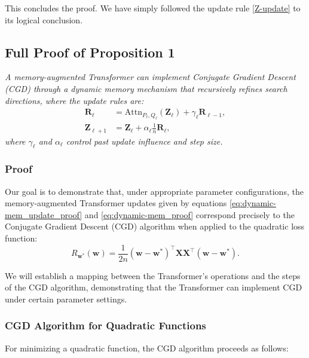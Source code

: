 \documentclass[11pt]{article}
\numberwithin{equation}{section}
\begin{document}
This concludes the proof. We have simply followed the update rule \eqref{Z-update} to its logical conclusion.

\subsection{Full Proof of Proposition 1}

\textit{A memory-augmented Transformer can implement Conjugate Gradient Descent (CGD) through a dynamic memory mechanism that recursively refines search directions, where the update rules are:}
\begin{align}
    \mathbf{R}_\ell &= \mathrm{Attn}_{P_\ell, Q_\ell}(\mathbf{Z}_\ell) + \gamma_\ell \mathbf{R}_{\ell-1}, \label{eq:dynamic-mem_update_proof} \\
    \mathbf{Z}_{\ell+1} &= \mathbf{Z}_\ell + \alpha_\ell \frac{1}{n} \mathbf{R}_\ell, \label{eq:dynamic-mem_proof}
\end{align}
\textit{where \( \gamma_\ell \) and \( \alpha_\ell \) control past update influence and step size.}

\subsubsection*{Proof}
Our goal is to demonstrate that, under appropriate parameter configurations, the memory-augmented Transformer updates given by equations \eqref{eq:dynamic-mem_update_proof} and \eqref{eq:dynamic-mem_proof} correspond precisely to the Conjugate Gradient Descent (CGD) algorithm when applied to the quadratic loss function:
\begin{equation}
    R_{\mathbf{w}^*}(\mathbf{w}) = \frac{1}{2n} (\mathbf{w} - \mathbf{w}^*)^\top \mathbf{X} \mathbf{X}^\top (\mathbf{w} - \mathbf{w}^*). \label{eq:quadratic_loss}
\end{equation}

We will establish a mapping between the Transformer's operations and the steps of the CGD algorithm, demonstrating that the Transformer can implement CGD under certain parameter settings.

\subsubsection*{CGD Algorithm for Quadratic Functions}
For minimizing a quadratic function, the CGD algorithm proceeds as follows:
\end{document}
